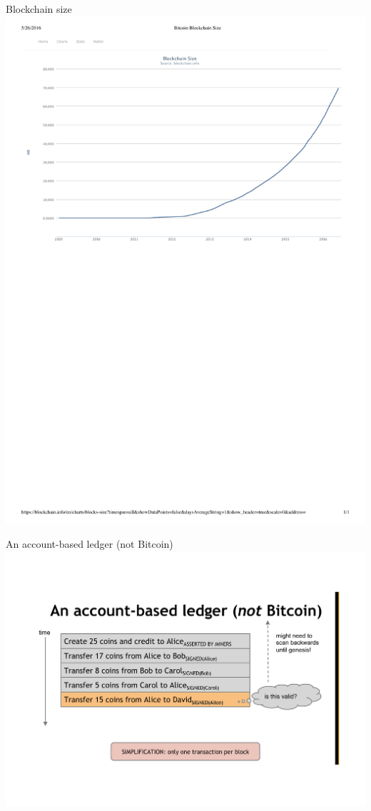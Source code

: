 
\begin{frame}{Blockchain size}
\includegraphics[width=\textwidth]{blockchain-size}
\end{frame}

\begin{frame}{An account-based ledger (not Bitcoin)}
\includegraphics[width=\textwidth,page=1]{ledger}
\end{frame}

